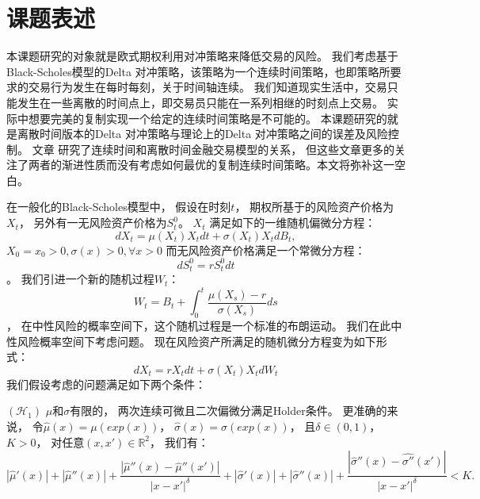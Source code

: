 
\section{课题表述} %
\label{sec:subject}

本课题研究的对象就是欧式期权利用对冲策略来降低交易的风险。
我们考虑基于Black-Scholes模型的Delta 对冲策略，该策略为一个连续时间策略，也即策略所要求的交易行为发生在每时每刻，关于时间轴连续。
我们知道现实生活中，交易只能发生在一些离散的时间点上，即交易员只能在一系列相继的时刻点上交易。
实际中想要完美的复制实现一个给定的连续时间策略是不可能的。
本课题研究的就是离散时间版本的Delta 对冲策略与理论上的Delta 对冲策略之间的误差及风险控制。
文章\cite{WhenIsTimeContinuous,Hayashi05evaluatinghedging,DiscreteTimeHedgingErrors} 研究了连续时间和离散时间金融交易模型的关系，
但这些文章更多的关注了两者的渐进性质而没有考虑如何最优的复制连续时间策略。本文将弥补这一空白。

在一般化的Black-Scholes模型中， 假设在时刻$t$， 期权所基于的风险资产价格为$X_t$， 另外有一无风险资产价格为$S_t^0$。
$X_t$ 满足如下的一维随机偏微分方程：
\begin{equation}
dX_t=\mu(X_t)X_tdt+\sigma(X_t)X_tdB_t,
\end{equation}
$X_0=x_0>0, \sigma(x)>0, \forall x>0$
而无风险资产价格满足一个常微分方程：
\begin{equation}
dS_t^0=rS^0_tdt
\end{equation}。
我们引进一个新的随机过程$W_t$：
\begin{equation}
W_t=B_t+\int^t_0\frac{\mu(X_s)-r}{\sigma(X_s)}ds
\end{equation}，
在中性风险的概率空间下，这个随机过程是一个标准的布朗运动。 我们在此中性风险概率空间下考虑问题。
现在风险资产所满足的随机微分方程变为如下形式：
\begin{equation}
dX_t=rX_tdt+\sigma(X_t)X_tdW_t
\end{equation}
我们假设考虑的问题满足如下两个条件：

$(\mathcal{H}_1)$ $\mu$和$\sigma$有限的， 两次连续可微且二次偏微分满足Holder条件。 更准确的来说， 令$\hat{\mu}(x)=\mu(exp(x))$， 
$\hat{\sigma}(x)=\sigma(exp(x))$， 且$\delta\in (0,1)$， $K>0$， 对任意$(x,x')\in \mathbb{R}^2$， 我们有：
\begin{equation}
|\hat{\mu}'(x)|+|\hat{\mu}''(x)|+\frac{|\hat{\mu}''(x)-\hat{\mu}''(x')|}{|x-x'|^\delta}+|\hat{\sigma}'(x)|+|\hat{\sigma}''(x)|+\frac{|\hat{\sigma}''(x)-\hat{\sigma''}(x')|}{|x-x'|^\delta}<K.
\end{equation}

